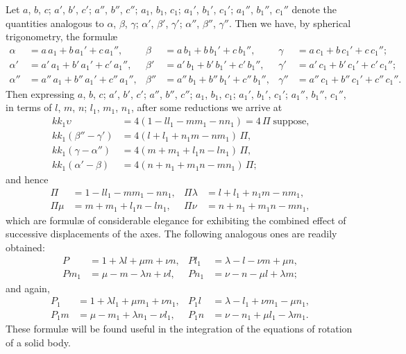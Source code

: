 \documentclass[11pt]{article}
\begin{document}
Let $a$, $b$, $c$; $a'$, $b'$, $c'$; $a''$, $b''$, $c''$; $a_1$, $b_1$, $c_1$; $a_1'$, $b_1'$, $c_1'$; $a_1''$, $b_1''$, $c_1''$ denote the quantities analogous to $\alpha$, $\beta$, $\gamma$; $\alpha'$, $\beta'$, $\gamma'$; $\alpha''$, $\beta''$, $\gamma''$. Then we have, by spherical trigonometry, the formul\ae{}
\[
\begin{aligned}
\alpha   &= a\,a_1 + b\,a_1' + c\,a_1'', & \beta   &= a\,b_1 + b\,b_1' + c\,b_1'', & \gamma   &= a\,c_1 + b\,c_1' + c\,c_1''; \\
\alpha'  &= a'\,a_1 + b'\,a_1' + c'\,a_1'', & \beta'  &= a'\,b_1 + b'\,b_1' + c'\,b_1'', & \gamma'  &= a'\,c_1 + b'\,c_1' + c'\,c_1''; \\
\alpha'' &= a''\,a_1 + b''\,a_1' + c''\,a_1'', & \beta'' &= a''\,b_1 + b''\,b_1' + c''\,b_1'', & \gamma'' &= a''\,c_1 + b''\,c_1' + c''\,c_1''.
\end{aligned}
\]
Then expressing $a$, $b$, $c$; $a'$, $b'$, $c'$; $a''$, $b''$, $c''$; $a_1$, $b_1$, $c_1$; $a_1'$, $b_1'$, $c_1'$; $a_1''$, $b_1''$, $c_1''$, in terms of $l$, $m$, $n$; $l_1$, $m_1$, $n_1$, after some reductions we arrive at
\[
\begin{aligned}
k k_1 \upsilon &= 4(1 - l l_1 - m m_1 - n n_1) = 4\,\Pi\;\text{suppose,} \\
k k_1 (\beta'' - \gamma') &= 4(l + l_1 + n_1 m - n m_1)\,\Pi, \\
k k_1 (\gamma - \alpha'') &= 4(m + m_1 + l_1 n - l n_1)\,\Pi, \\
k k_1 (\alpha' - \beta)   &= 4(n + n_1 + m_1 n - m n_1)\,\Pi;
\end{aligned}
\]
and hence
\[
\begin{aligned}
\Pi      &= 1 - l l_1 - m m_1 - n n_1, & \Pi\lambda &= l + l_1 + n_1 m - n m_1, \\
\Pi\mu   &= m + m_1 + l_1 n - l n_1, & \Pi\nu      &= n + n_1 + m_1 n - m n_1,
\end{aligned}
\]
which are formul\ae{} of considerable elegance for exhibiting the combined effect of successive displacements of the axes. The following analogous ones are readily obtained:
\[
\begin{aligned}
P      &= 1 + \lambda l + \mu m + \nu n, & P l_1 &= \lambda - l - \nu m + \mu n, \\
P m_1  &= \mu - m - \lambda n + \nu l,    & P n_1 &= \nu - n - \mu l + \lambda m;
\end{aligned}
\]
and again,
\[
\begin{aligned}
P_1    &= 1 + \lambda l_1 + \mu m_1 + \nu n_1, & P_1 l &= \lambda - l_1 + \nu m_1 - \mu n_1, \\
P_1 m  &= \mu - m_1 + \lambda n_1 - \nu l_1,   & P_1 n &= \nu - n_1 + \mu l_1 - \lambda m_1.
\end{aligned}
\]
These formul\ae{} will be found useful in the integration of the equations of rotation of a solid body.
\end{document}

